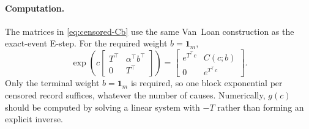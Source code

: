 \documentclass{article}
\newcommand{\subchg}[1]{#1}
\begin{document}
\paragraph{Computation.}
The matrices in \eqref{eq:censored-Cb} use the same Van~Loan construction as the exact-event E-step. \subchg{For the required weight $b=\mathbf 1_m$,}
\begin{equation}
\label{eq:censored-vanloan}
\exp\!\left(c\begin{bmatrix}
T^\intercal&\alpha^\intercal b^\intercal\\[2pt]0&T^\intercal
\end{bmatrix}\right)
=\begin{bmatrix}e^{T^\intercal c}&C(c;b)\\[2pt]0&e^{T^\intercal c}\end{bmatrix}.
\end{equation}
\subchg{Only the terminal weight $b=\mathbf 1_m$ is required, so one block exponential per censored record suffices, whatever the number of causes. Numerically, $g(c)$ should be computed by solving a linear system with $-T$ rather than forming an explicit inverse.}





\end{document}
